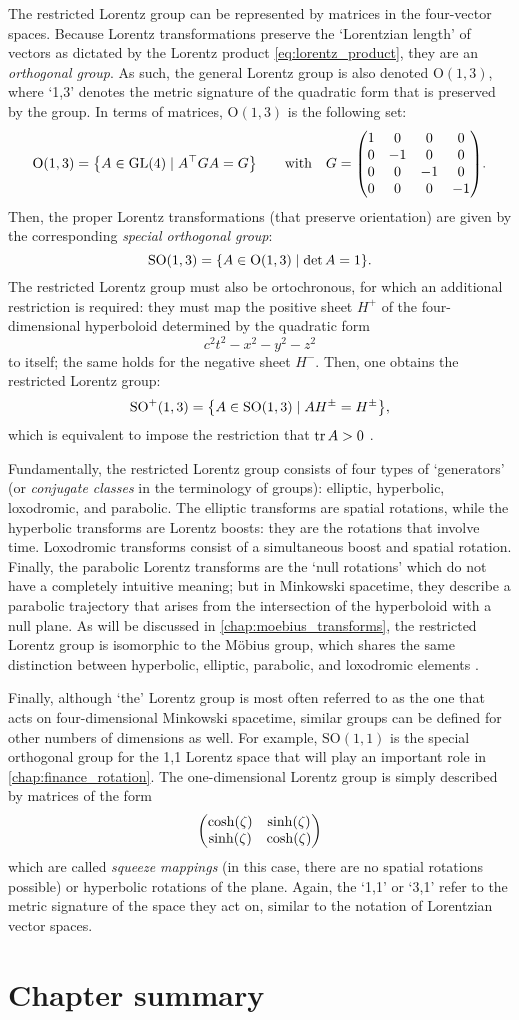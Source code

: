 The restricted Lorentz group can be represented by matrices in the four-vector spaces. Because Lorentz transformations preserve the `Lorentzian length' of vectors as dictated by the Lorentz product \cref{eq:lorentz_product}, they are an \emph{orthogonal group}. As such, the general Lorentz group is also denoted $\text{O}(1,3)$, where `1,3' denotes the metric signature of the quadratic form that is preserved by the group. In terms of matrices, $\text{O}(1,3)$ is the following set: \cite{Baker1967}
$$ \text{O}(1, 3) = \qty{A \in \text{GL}(4) \mid A^\top G A = G} \qquad \text{with}\quad G = \mqty(\dmat[0]{1,-1,-1,-1}). $$
Then, the proper Lorentz transformations (that preserve orientation) are given by the corresponding \emph{special orthogonal group}:
$$ \text{SO}(1, 3) = \qty{A \in \text{O}(1, 3) \mid \det A = 1}.$$
The restricted Lorentz group must also be ortochronous, for which an additional restriction is required: they must map the positive sheet $H^+$ of the four-dimensional hyperboloid determined by the quadratic form 
$$ c^2t^2 - x^2 - y^2 - z^2 $$
to itself; the same holds for the negative sheet $H^-$. Then, one obtains the restricted Lorentz group: \cite{Baker1967}
$$ \text{SO}^+(1, 3) = \qty{A \in \text{SO}(1, 3) \mid AH^{\pm} = H^{\pm}}, $$
which is equivalent to impose the restriction that $\trace A > 0$ \cite{Balazs1986}.

Fundamentally, the restricted Lorentz group consists of four types of `generators' (or \emph{conjugate classes} in the terminology of groups): elliptic, hyperbolic, loxodromic, and parabolic. The elliptic transforms are spatial rotations, while the hyperbolic transforms are Lorentz boosts: they are the rotations that involve time. Loxodromic transforms consist of a simultaneous boost and spatial rotation. Finally, the parabolic Lorentz transforms are the `null rotations' which do not have a completely intuitive meaning; but in Minkowski spacetime, they describe a parabolic trajectory that arises from the intersection of the hyperboloid with a null plane. As will be discussed in \cref{chap:moebius_transforms}, the restricted Lorentz group is isomorphic to the Möbius group, which shares the same distinction between hyperbolic, elliptic, parabolic, and loxodromic elements \cite{Needham2021}.

Finally, although `the' Lorentz group is most often referred to as the one that acts on four-dimensional Minkowski spacetime, similar groups can be defined for other numbers of dimensions as well. For example, $\text{SO}(1, 1)$ is the special orthogonal group for the 1,1 Lorentz space that will play an important role in \cref{chap:finance_rotation}. The one-dimensional Lorentz group is simply described by matrices of the form
$$ \mqty(\cosh(\zeta) & \sinh(\zeta)\\\sinh(\zeta)&\cosh(\zeta)) $$
which are called \emph{squeeze mappings} (in this case, there are no spatial rotations possible) or hyperbolic rotations of the plane. Again, the `1,1' or `3,1' refer to the metric signature of the space they act on, similar to the notation of Lorentzian vector spaces.

\section*{Chapter summary}